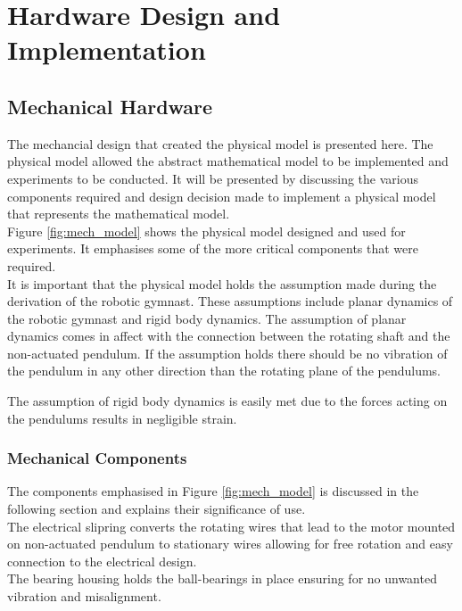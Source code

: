 \chapter{Hardware Design and Implementation}


\section{Mechanical Hardware}
The mechancial design that created the physical model is presented here. The physical model allowed the abstract mathematical model to be implemented and experiments to be conducted. It will be presented by discussing the various components required and design decision made to implement a physical model that represents the mathematical model.\\

Figure \ref{fig:mech_model} shows the physical model designed and used for experiments. It emphasises some of the more critical components that were required.\\

It is important that the physical model holds the assumption made during the derivation of the robotic gymnast. These assumptions include planar dynamics of the robotic gymnast and rigid body dynamics. The assumption of planar dynamics comes in affect with the connection between the rotating shaft and the non-actuated pendulum. If the assumption holds there should be no vibration of the pendulum in any other direction than the rotating plane of the pendulums. 

The assumption of rigid body dynamics is easily met due to the forces acting on the pendulums results in negligible strain.

\subsection{Mechanical Components}
The components emphasised in Figure \ref{fig:mech_model} is discussed in the following section and explains their significance of use.\\

The electrical slipring converts the rotating wires that lead to the motor mounted on non-actuated pendulum to stationary wires allowing for free rotation and easy connection to the electrical design.\\

The bearing housing holds the ball-bearings in place ensuring for no unwanted vibration and misalignment.


